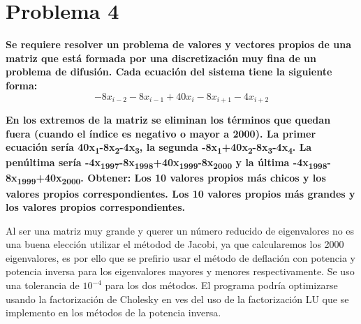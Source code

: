 \section*{Problema 4}

\textbf{
    Se requiere resolver un problema de valores y vectores propios de una matriz que está formada por una discretización muy fina de un problema de difusión. Cada ecuación del sistema tiene la siguiente forma:
}
\begin{equation*}
    -8x_{i-2} -8x_{i-1}+40x_{i}-8x_{i+1}-4x_{i+2}
\end{equation*}

\textbf{En los extremos de la matriz se eliminan los términos que quedan fuera (cuando el índice es negativo o mayor a 2000). La primer ecuación sería 40x\textsubscript{1}-8x\textsubscript{2}-4x\textsubscript{3}, la segunda -8x\textsubscript{1}+40x\textsubscript{2}-8x\textsubscript{3}-4x\textsubscript{4}. La penúltima sería -4x\textsubscript{1997}-8x\textsubscript{1998}+40x\textsubscript{1999}-8x\textsubscript{2000} y la última -4x\textsubscript{1998}-8x\textsubscript{1999}+40x\textsubscript{2000}.
    Obtener: Los 10 valores propios más chicos y los valores propios correspondientes. Los 10 valores propios más grandes y los valores propios correspondientes.}


Al ser una matriz muy grande y querer un número reducido de eigenvalores no es una buena elección utilizar el métodod de Jacobi, ya que calcularemos los 2000 eigenvalores, es por ello que se prefirio usar el método de deflación con potencia y potencia inversa para los eigenvalores mayores y menores respectivamente. Se uso una tolerancia de  $10^{-4}$ para los dos métodos. El programa podría optimizarse usando la factorización de Cholesky en ves del uso de la factorización LU que se implemento en los métodos de la potencia inversa.